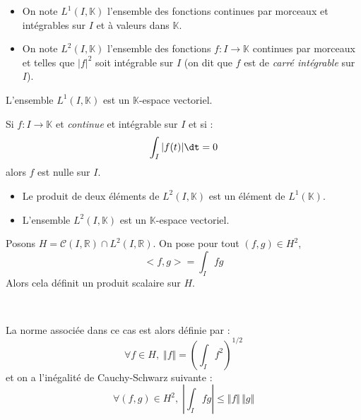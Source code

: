 \documentclass[a4paper,10pt]{report}
\begin{document}
\begin{defin} 
\begin{itemize}
\item On note $L^1(I, \mathbb{K})$ l'ensemble des fonctions continues par morceaux et intégrables sur $I$ et à valeurs dans $\mathbb{K}$.
\item On note $L^2(I, \mathbb{K})$ l'ensemble des fonctions $f : I \rightarrow \mathbb{K}$ continues par morceaux et telles que $\vert f \vert^2$ soit intégrable sur $I$ (on dit que $f$ est de \textit{carré intégrable} sur $I$).
\end{itemize}
\end{defin}

\begin{prop} L'ensemble $L^1(I, \mathbb{K})$ est un $\mathbb{K}$-espace vectoriel.
\end{prop}

\begin{preuve} 

\vspace{6.5cm}
\end{preuve}

\begin{rem} Si $f : I \rightarrow \mathbb{K}$ et \textit{continue} et intégrable sur $I$ et si :
$$ \int_{I} \vert f(t) \vert \dt =0$$
alors $f$ est nulle sur $I$.
\end{rem}

\begin{prop} 
\begin{itemize}
\item Le produit de deux éléments de $L^2(I, \mathbb{K})$ est un élément de $L^1(\mathbb{K})$.
\item L'ensemble $L^2(I, \mathbb{K})$ est un $\mathbb{K}$-espace vectoriel.
\end{itemize}
 \end{prop}
 
 \begin{preuve}
 \vspace{8.5cm}
 \end{preuve}
 
 \begin{prop} Posons $H = \mathcal{C}(I, \mathbb{R}) \cap L^2(I, \mathbb{R})$. On pose pour tout $(f,g) \in H^2$,
 $$ <f,g> = \int_{I} fg$$
Alors cela définit un produit scalaire sur $H$.
 \end{prop}
 
 \newpage
 
 $\phantom{test}$
 
\begin{preuve}
 
 \vspace{4cm}
 \end{preuve}
 
\begin{rem} La norme associée dans ce cas est alors définie par :
$$ \forall f \in H, \; \Vert f \Vert = \left( \int_{I} f^2 \right)^{1/2} $$
et on a l'inégalité de Cauchy-Schwarz suivante :
$$ \forall (f,g) \in H^2, \; \left\vert \int_{I} fg  \right\vert \leq  \Vert f \Vert \, \Vert g \Vert $$
\end{rem}
\end{document}
